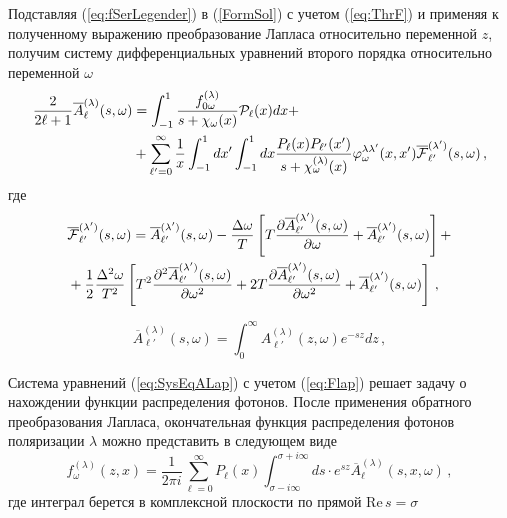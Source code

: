 \documentclass[a4paper]{panl}
\begin{document}
Подставляя (\ref{eq:fSerLegender}) в (\ref{FormSol}) с учетом (\ref{eq:ThrF}) и применяя к полученному выражению преобразование Лапласа относительно переменной $z$, получим систему дифференциальных уравнений второго порядка относительно переменной $\omega$
\begin{equation}\label{eq:SysEqALap}
\begin{aligned}
\frac{2}{2 \ell +1} \overline{A}_\ell^{(\lambda)}(s,\omega) &= \int_{-1}^{1} \frac{f_{0\omega}^{(\lambda)}}{s+{\cal \chi}_\omega(x)}{\cal P}_\ell(x)dx+
\\
&+ \sum_{\ell'=0}^{\infty}\frac{1}{x}\int_{-1}^{1}dx'\int_{-1}^{1}dx \frac{P_\ell(x) P_{\ell'}(x')}{s+{\cal \chi}_\omega^{(\lambda)}(x)} \varphi_\omega^{\lambda\lambda'}(x,x') {\overline{\cal F}}_{\ell'}^{(\lambda')}(s,\omega)\, ,
\end{aligned}
\end{equation}
где 
\begin{equation}\label{eq:Flap}
\begin{aligned}
&{\overline{\cal F}}_{\ell'}^{(\lambda')}(s,\omega) = \overline{A}_{\ell'}^{(\lambda')}(s,\omega) - \frac{\Delta \omega}{T}
\left[
T \frac{\partial \overline{A}_{\ell'}^{(\lambda')}(s,\omega)}{\partial \omega} + \overline{A}_{\ell'}^{(\lambda')}(s,\omega)
\right]+
\\
&+ \frac{1}{2}\frac{\Delta^2 \omega}{T^2}
\left[
T^2 \frac{\partial^2 \overline{A}_{\ell'}^{(\lambda')}(s,\omega)}{\partial \omega^2} + 2T \frac{\partial \overline{A}_{\ell'}^{(\lambda')}(s,\omega)}{\partial \omega^2}+\overline{A}_{\ell'}^{(\lambda')}(s,\omega)
\right]\, ,
\end{aligned}
\end{equation}

\begin{equation}\label{lapA}
\overline{A}_{\ell'}^{(\lambda)}(s,\omega)=\int_{0}^{\infty} A^{(\lambda)}_{\ell'}(z,\omega) e^{-sz}dz\, ,
\end{equation}



Система уравнений (\ref{eq:SysEqALap}) с учетом (\ref{eq:Flap}) решает задачу о нахождении функции распределения фотонов. После применения обратного преобразования Лапласа, окончательная функция распределения фотонов поляризации $\lambda$ можно представить в следующем виде
\begin{equation}
f_\omega^{(\lambda)}(z, x) = \frac{1}{2\pi i}\sum_{\ell=0}^{\infty} 
P_\ell(x)\int_{\sigma-i\infty}^{\sigma + i \infty}ds \cdot e^{sz} \overline{A}^{(\lambda)}_\ell(s,x,\omega)\, ,
\end{equation}
где интеграл берется в комплексной плоскости по прямой $\text{Re} \, s = \sigma$
\end{document}
